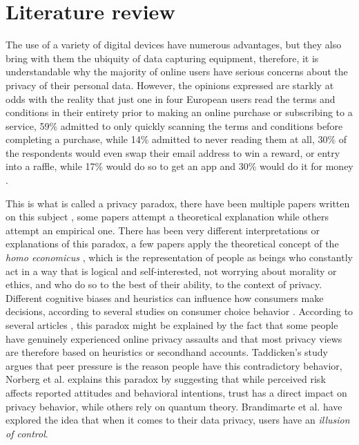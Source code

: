 \documentclass[conference]{IEEEtran}
\begin{document}
\section{Literature review}

The use of a variety of digital devices have numerous advantages, but
they also bring with them the ubiquity of data capturing equipment, therefore,
it is understandable why the majority of online users have serious concerns
about the privacy of their personal data. However, the opinions expressed
are starkly at odds with the reality that just one in four European users
read the terms and conditions in their entirety prior to making an online
purchase or subscribing to a service, 59\% admitted to only quickly scanning
the terms and conditions before completing a purchase, while 14\% admitted
to never reading them at all, 30\% of the respondents would even swap
their email address to win a reward, or entry into a raffle, while 17\% would
do so to get an app and 30\% would do it for money \cite{DarrenState}.

This is what is called a privacy paradox, there have been multiple papers
written on this subject \cite{solove2021myth, WilliamsPrivacy, lee2021investigating, goad2021privacy, gerber2018explaining},
some papers attempt a theoretical explanation while others attempt an empirical one.
There has been very different interpretations or explanations of this paradox,
a few papers \cite{wilson2012unpacking, warshaw2015can, lee2015privacy} apply the theoretical concept of the \textit{homo economicus} \cite{zak2008moral},
which is the representation of people as beings who constantly act in a way
that is logical and self-interested, not worrying about morality or ethics, and
who do so to the best of their ability, to the context of privacy.
Different cognitive biases and heuristics can influence how consumers make decisions,
according to several studies on consumer choice behavior \cite{acquisti2007can, knijnenburg2013dimensionality, wakefield2013influence, flender2012type}.
According to several articles \cite{dienlin2015privacy, baek2014solving}, this paradox might be explained by the
fact that some people have genuinely experienced online privacy assaults
and that most privacy views are therefore based on heuristics or secondhand accounts.
Taddicken's study \cite{taddicken2014privacy} argues that peer pressure is the reason people have this contradictory behavior,
Norberg et al. \cite{norberg2007privacy} explains this paradox by suggesting that while perceived
risk affects reported attitudes and behavioral intentions, trust has a direct
impact on privacy behavior, while others \cite{flender2012type, kokolakis2017privacy} rely on quantum theory.
Brandimarte et al. \cite{brandimarte2013misplaced} have explored the idea that when it comes to their
data privacy, users have an \textit{illusion of control}.
\end{document}
